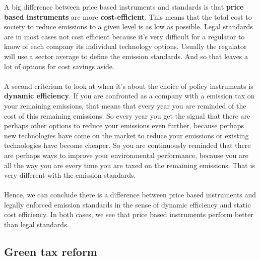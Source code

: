 \documentclass[../summary.tex]{subfiles}
\begin{document}
	   A big difference between price based instruments and standards is that \textbf{price based instruments} are more \textbf{cost-efficient}. This means that the total cost to society to reduce emissions to a given level is as low as possible. Legal standards are in most cases not cost efficient because it's very difficult for a regulator to know of each company its individual technology options. Usually the regulator will use a sector average to define the emission standards. And so that leaves a lot of options for cost savings aside.
	   \\\\
	   A second criterium to look at when it's about the choice of policy instruments is \textbf{dynamic efficiency}. If you are confronted as a company with a emission tax on your remaining emissions, that means that every year you are reminded of the cost of this remaining emissions. So every year you get the signal that there are perhaps other options to reduce your emissions even further, because perhaps new technologies have come on the market to reduce your emissions or existing technologies have become cheaper. So you are continuously reminded that there are perhaps ways to improve your environmental performance, because you are all the way you are every time you are taxed on the remaining emissions. That is very different with the emission standards.
	   \\\\
	   Hence, we can conclude there is a difference between price based instruments and legally enforced emission standards in the sense of dynamic efficiency and static cost efficiency. In both cases, we see that price based instruments perform better than legal standards.
	  
	  \subsection{Green tax reform}
	  
\end{document}
